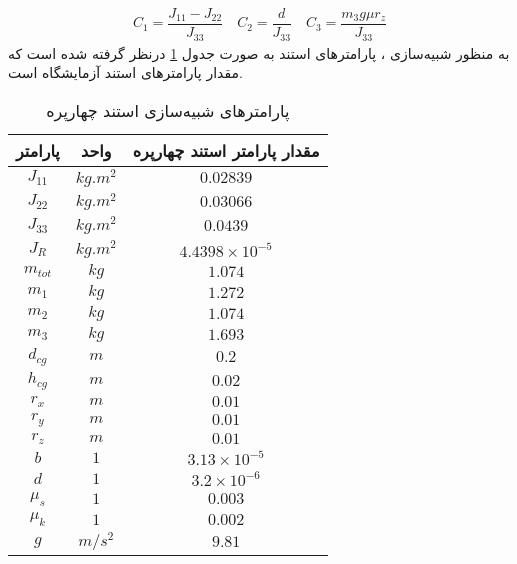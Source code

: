 \begin{align*}
	C_1 =\dfrac{J_{11}-J_{22}}{J_{33}}\quad
	C_2 =\dfrac{d}{J_{33}}\quad
	C_3 = \dfrac{m_3g\mu r_z}{ J_{33}}
\end{align*}
به منظور شبیه‌سازی ، پارامترهای استند به صورت جدول 
\ref{parameterstable}
درنظر گرفته شده است که 
مقدار پارامترهای استند آزمایشگاه است.
\begin{table}[H]
	\caption {پارامترهای شبیه‌سازی استند چهارپره \cite{norian}} 
	\label{parameterstable}
	\begin{center}
		\begin{tabular}{ c c c }
			\hline
	پارامتر & واحد & مقدار پارامتر استند چهارپره    \\
			\hline

			$J_{11}$ & $kg.m^2$& $0.02839$    \\
			$J_{22}$ & $kg.m^2$& $0.03066$   \\
			$J_{33}$ & $kg.m^2$&$0.0439$    \\
			$J_{R}$   & $kg.m^2$&$4.4398\times 10^{-5}$\\
			$m_{tot}$ & $kg$& $1.074$    \\
			$m_{1}$ & $kg$& $1.272$    \\
			$m_{2}$ & $kg$& $1.074$    \\
			$m_{3}$ & $kg$& $1.693$    \\
			$d_{cg}$ & $m$ &$0.2$     \\
			$h_{cg}$ & $m$  &$0.02$   \\
			$r_{x}$ & $m$& $0.01$    \\
			$r_{y}$ & $m$& $0.01$    \\
			$r_{z}$ & $m$& $0.01$    \\
			$b$ &  $1$ &$3.13\times10^{-5}$   \\
			$d$ & $1$&$3.2\times10^{-6}$   \\
			$\mu_{s}$ & $1$& $0.003$    \\
			$\mu_{k}$ & $1$& $0.002$    \\
			$g$&$m/s^2$&$9.81$\\
			\hline
		\end{tabular}
	\end{center}
\end{table}


